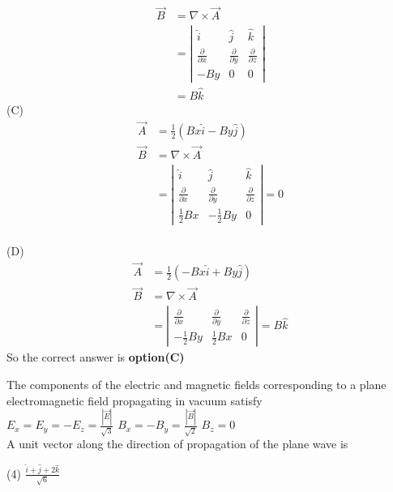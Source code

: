 \begin{questions}
\begin{answer}
$$
\begin{aligned}
\vec{B} &=\nabla \times \vec{A} \\
&=\left|\begin{array}{rrr}
\hat{i} & \hat{j} & \hat{k} \\
\frac{\partial}{\partial x} & \frac{\partial}{\partial y} & \frac{\partial}{\partial z} \\
-B y & 0 & 0
\end{array}\right| \\
&=B \hat{k}
\end{aligned}
$$
(C)
$$
\begin{aligned}
\vec{A} &=\frac{1}{2}(B x \hat{i}-B y \hat{j}) \\
\vec{B} &=\nabla \times \vec{A} \\
&=\left|\begin{array}{rrr}
\hat{i} & \hat{j} & \hat{k} \\
\frac{\partial}{\partial x} & \frac{\partial}{\partial y} & \frac{\partial}{\partial z} \\
\frac{1}{2} B x & -\frac{1}{2} B y & 0
\end{array}\right|=0
\end{aligned}
$$\\
(D)
$$
\begin{aligned}
\vec{A} &=\frac{1}{2}(-B x \hat{i}+B y \hat{j}) \\
\vec{B} &=\nabla \times \vec{A} \\
&=\left|\begin{array}{rrr}
\frac{\partial}{\partial x} & \frac{\partial}{\partial y} & \frac{\partial}{\partial z} \\
-\frac{1}{2} B y & \frac{1}{2} B x & 0
\end{array}\right|=B \hat{k}
\end{aligned}
$$
	So the correct answer is \textbf{option(C)}
\end{answer}
\begin{minipage}{\textwidth}
	\question The components of the electric and magnetic fields corresponding to a plane electromagnetic field propagating in vacuum satisfy\\
	$E_{x}=E_{y}=-E_{z}=\frac{|\vec{E}|}{\sqrt{3}}$
	$B_{x}=-B_{y}=\frac{|\vec{B}|}{\sqrt{2}}$
	$B_{z}=0$\\
	A unit vector along the direction of propagation of the plane wave is
\end{minipage}
\begin{tasks}(4)
	\task[\textbf{A.}] $\frac{\hat{i}+\hat{j}+2 \hat{k}}{\sqrt{6}}$

\end{tasks}
\end{questions}
